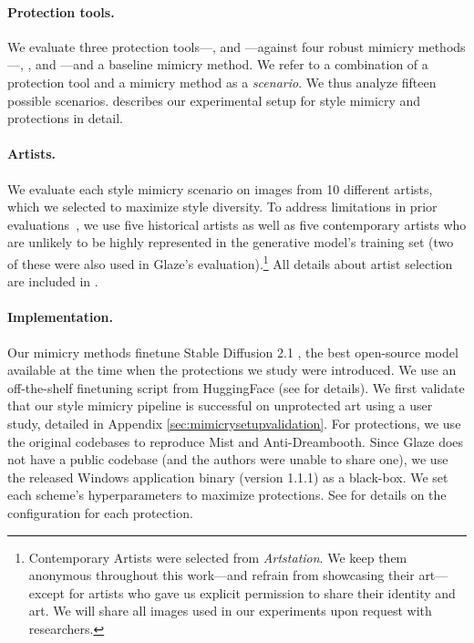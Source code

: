 \documentclass{article}
\begin{document}
\paragraph{Protection tools.}
We evaluate three protection tools---,  and ---against four robust mimicry methods---, ,  and ---and a baseline mimicry method.
We refer to a combination of a protection tool and a mimicry method as a \emph{scenario}. We thus analyze fifteen possible scenarios.  describes our experimental setup for style mimicry and protections in detail.


\paragraph{Artists.}
We evaluate each style mimicry scenario on images from 10 different artists, which we selected to maximize style diversity. To address limitations in prior evaluations~\citep{glazeresponsetoimpress}, we use five historical artists
as well as five contemporary artists who are unlikely to be highly represented in the generative model's training set (two of these were also used in Glaze's evaluation).\footnote{Contemporary Artists were selected from \emph{Artstation}. We keep them anonymous throughout this work---and refrain from showcasing their art---except for artists who gave us explicit permission to share their identity and art. We will share all images used in our experiments upon request with researchers.} All details about artist selection are included in .

\paragraph{Implementation.}
Our mimicry methods finetune Stable Diffusion 2.1 \citep{stablediffusion}, the best open-source model available at the time when the protections we study were introduced.
We use an off-the-shelf finetuning script from HuggingFace
(see  for details).
We first validate that our style mimicry pipeline is successful on unprotected art using a user study, detailed in Appendix \ref{sec:mimicrysetupvalidation}. For protections, we use the original codebases to reproduce Mist and Anti-Dreambooth. Since Glaze does not have a public codebase (and the authors were unable to share one), we use the released Windows application binary (version 1.1.1) as a black-box.
We set each scheme's hyperparameters to maximize protections.
See  for details on the configuration for each protection.
\end{document}
